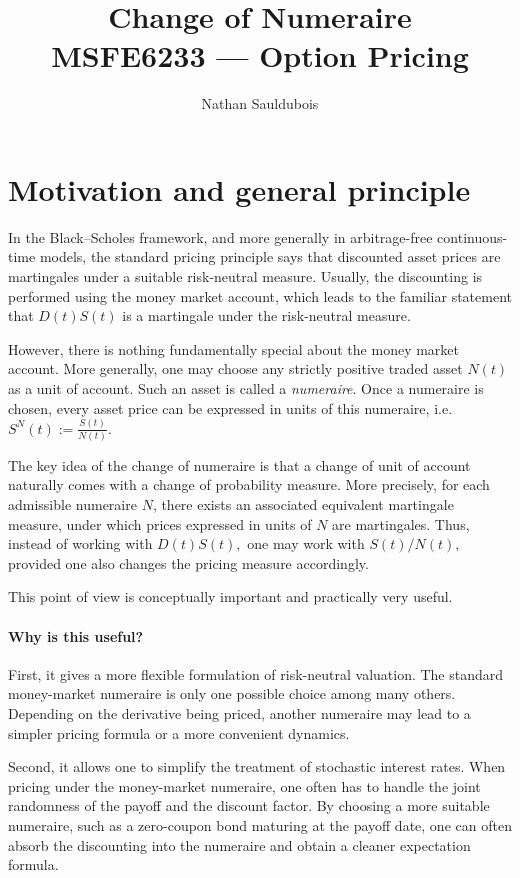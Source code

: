 \documentclass[11pt]{article}
\title{\textbf{Change of Numeraire}\\
\large MSFE6233 --- Option Pricing}
\author{Nathan Sauldubois}
\date{}
\theoremstyle{definition}
\theoremstyle{plain}
\begin{document}
\maketitle

\vspace{-1em}

\section{Motivation and general principle}


In the Black--Scholes framework, and more generally in arbitrage-free
continuous-time models, the standard pricing principle says that
discounted asset prices are martingales under a suitable risk-neutral
measure.
Usually, the discounting is performed using the money market account,
which leads to the familiar statement that
$
D(t)S(t)
$
is a martingale under the risk-neutral measure.

However, there is nothing fundamentally special about the money market
account.
More generally, one may choose any strictly positive traded asset
$
N(t)
$
as a unit of account.
Such an asset is called a \emph{numeraire}.
Once a numeraire is chosen, every asset price can be expressed in units
of this numeraire, i.e.
$
S^N(t):=\frac{S(t)}{N(t)}.
$

The key idea of the change of numeraire is that a change of unit of
account naturally comes with a change of probability measure.
More precisely, for each admissible numeraire \(N\), there exists an
associated equivalent martingale measure, under which prices expressed
in units of \(N\) are martingales.
Thus, instead of working with
$
D(t)S(t),
$
one may work with
$
S(t)/N(t),
$
provided one also changes the pricing measure accordingly.

This point of view is conceptually important and practically very
useful.

\paragraph{Why is this useful?}

First, it gives a more flexible formulation of risk-neutral valuation.
The standard money-market numeraire is only one possible choice among
many others.
Depending on the derivative being priced, another numeraire may lead to
a simpler pricing formula or a more convenient dynamics.

Second, it allows one to simplify the treatment of stochastic interest
rates.
When pricing under the money-market numeraire, one often has to handle
the joint randomness of the payoff and the discount factor.
By choosing a more suitable numeraire, such as a zero-coupon bond
maturing at the payoff date, one can often absorb the discounting into
the numeraire and obtain a cleaner expectation formula.
\end{document}
